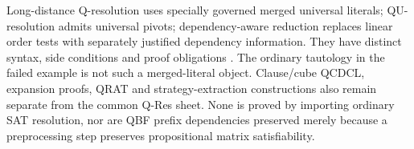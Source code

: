 Long-distance Q-resolution uses specially governed merged universal literals;
QU-resolution admits universal pivots; dependency-aware reduction replaces
linear order tests with separately justified dependency information.  They
have distinct syntax, side conditions and proof obligations
\cite[Sec.~2.3.2]{BeyersdorffEtAl2021QBFJulyAuthor}.  The ordinary tautology
in the failed example is not such a merged-literal object.  Clause/cube
QCDCL, expansion proofs, QRAT and strategy-extraction constructions also
remain separate from the common Q-Res sheet.  None is proved by importing
ordinary SAT resolution, nor are QBF prefix dependencies preserved merely
because a preprocessing step preserves propositional matrix satisfiability.
